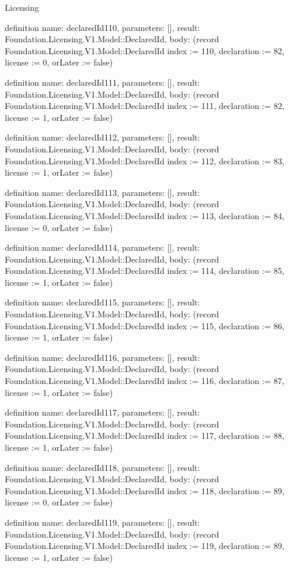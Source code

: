 \begin{lexlean}{Licensing}
\begin{semanticmodule}
definition{
  name: declaredId110,
  parameters: [],
  result: Foundation.Licensing.V1.Model::DeclaredId,
  body: (record Foundation.Licensing.V1.Model::DeclaredId {index := 110, declaration := 82, license := 0, orLater := false})
}

definition{
  name: declaredId111,
  parameters: [],
  result: Foundation.Licensing.V1.Model::DeclaredId,
  body: (record Foundation.Licensing.V1.Model::DeclaredId {index := 111, declaration := 82, license := 1, orLater := false})
}

definition{
  name: declaredId112,
  parameters: [],
  result: Foundation.Licensing.V1.Model::DeclaredId,
  body: (record Foundation.Licensing.V1.Model::DeclaredId {index := 112, declaration := 83, license := 1, orLater := false})
}

definition{
  name: declaredId113,
  parameters: [],
  result: Foundation.Licensing.V1.Model::DeclaredId,
  body: (record Foundation.Licensing.V1.Model::DeclaredId {index := 113, declaration := 84, license := 0, orLater := false})
}

definition{
  name: declaredId114,
  parameters: [],
  result: Foundation.Licensing.V1.Model::DeclaredId,
  body: (record Foundation.Licensing.V1.Model::DeclaredId {index := 114, declaration := 85, license := 1, orLater := false})
}

definition{
  name: declaredId115,
  parameters: [],
  result: Foundation.Licensing.V1.Model::DeclaredId,
  body: (record Foundation.Licensing.V1.Model::DeclaredId {index := 115, declaration := 86, license := 1, orLater := false})
}

definition{
  name: declaredId116,
  parameters: [],
  result: Foundation.Licensing.V1.Model::DeclaredId,
  body: (record Foundation.Licensing.V1.Model::DeclaredId {index := 116, declaration := 87, license := 1, orLater := false})
}

definition{
  name: declaredId117,
  parameters: [],
  result: Foundation.Licensing.V1.Model::DeclaredId,
  body: (record Foundation.Licensing.V1.Model::DeclaredId {index := 117, declaration := 88, license := 1, orLater := false})
}

definition{
  name: declaredId118,
  parameters: [],
  result: Foundation.Licensing.V1.Model::DeclaredId,
  body: (record Foundation.Licensing.V1.Model::DeclaredId {index := 118, declaration := 89, license := 0, orLater := false})
}

definition{
  name: declaredId119,
  parameters: [],
  result: Foundation.Licensing.V1.Model::DeclaredId,
  body: (record Foundation.Licensing.V1.Model::DeclaredId {index := 119, declaration := 89, license := 1, orLater := false})
}


\end{semanticmodule}
\end{lexlean}

